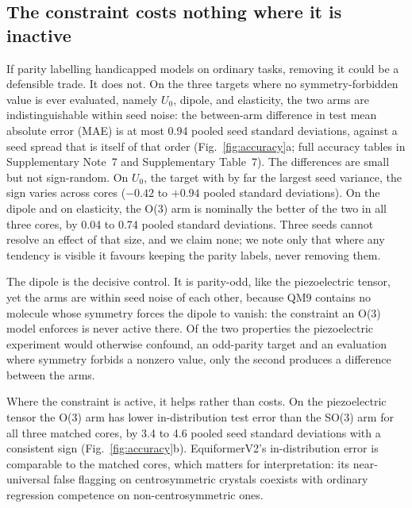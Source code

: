 \subsection*{The constraint costs nothing where it is inactive}

If parity labelling handicapped models on ordinary tasks, removing it could be a defensible trade. It does not. On the three targets where no symmetry-forbidden value is ever evaluated, namely $U_0$, dipole, and elasticity, the two arms are indistinguishable within seed noise: the between-arm difference in test mean absolute error (MAE) is at most 0.94 pooled seed standard deviations, against a seed spread that is itself of that order (Fig.~\ref{fig:accuracy}a; full accuracy tables in Supplementary Note~7 and Supplementary Table~7). The differences are small but not sign-random. On $U_0$, the target with by far the largest seed variance, the sign varies across cores ($-0.42$ to $+0.94$ pooled standard deviations). On the dipole and on elasticity, the O(3) arm is nominally the better of the two in all three cores, by 0.04 to 0.74 pooled standard deviations. Three seeds cannot resolve an effect of that size, and we claim none; we note only that where any tendency is visible it favours keeping the parity labels, never removing them.

The dipole is the decisive control. It is parity-odd, like the piezoelectric tensor, yet the arms are within seed noise of each other, because QM9 contains no molecule whose symmetry forces the dipole to vanish: the constraint an O(3) model enforces is never active there. Of the two properties the piezoelectric experiment would otherwise confound, an odd-parity target and an evaluation where symmetry forbids a nonzero value, only the second produces a difference between the arms.

Where the constraint is active, it helps rather than costs. On the piezoelectric tensor the O(3) arm has lower in-distribution test error than the SO(3) arm for all three matched cores, by 3.4 to 4.6 pooled seed standard deviations with a consistent sign (Fig.~\ref{fig:accuracy}b). EquiformerV2's in-distribution error is comparable to the matched cores, which matters for interpretation: its near-universal false flagging on centrosymmetric crystals coexists with ordinary regression competence on non-centrosymmetric ones.

